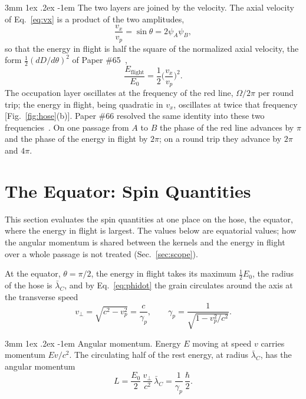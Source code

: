 \documentclass[%
 reprint, amsmath,amssymb, aps, prb, ]{revtex4-2}
\makeatletter
\numberwithin{equation}{section}
\renewcommand\paragraph{%
  \@startsection{paragraph}{4}{\z@}%
    {3mm \@plus 1ex \@minus .2ex}%
    {-1em}%
    {\normalfont\normalsize\itshape}}
\newcommand{\lbar}{\bar{\lambda}_C}
\makeatother
\begin{document}
\paragraph{The two layers are joined by the velocity.} The axial velocity of Eq.~\eqref{eq:vx} is a product of the two amplitudes,
\begin{equation}
\frac{v_x}{v_p} = \sin\theta = 2\psi_A\psi_B ,
\label{eq:vprod}
\end{equation}
so that the energy in flight is half the square of the normalized axial velocity, the form $\tfrac12(dD/d\theta)^2$ of Paper \#65~\cite{H65},
\begin{equation}
\frac{E_{\text{flight}}}{E_0} = \frac12\Big(\frac{v_x}{v_p}\Big)^2 .
\label{eq:flightv}
\end{equation}
The occupation layer oscillates at the frequency of the red line, $\Omega/2\pi$ per round trip; the energy in flight, being quadratic in $v_x$, oscillates at twice that frequency [Fig.~\ref{fig:hose}(b)]. Paper \#66 resolved the same identity into these two frequencies~\cite{H66}. On one passage from $A$ to $B$ the phase of the red line advances by $\pi$ and the phase of the energy in flight by $2\pi$; on a round trip they advance by $2\pi$ and $4\pi$.

\section{The Equator: Spin Quantities}
\label{sec:ring}

This section evaluates the spin quantities at one place on the hose, the equator, where the energy in flight is largest. The values below are equatorial values; how the angular momentum is shared between the kernels and the energy in flight over a whole passage is not treated (Sec.~\ref{sec:scope}).

At the equator, $\theta = \pi/2$, the energy in flight takes its maximum $\tfrac12E_0$, the radius of the hose is $\lbar$, and by Eq.~\eqref{eq:phidot} the grain circulates around the axis at the transverse speed
\begin{equation}
v_\perp = \sqrt{c^2 - v_p^2} = \frac{c}{\gamma_p}, \qquad \gamma_p = \frac{1}{\sqrt{1 - v_p^2/c^2}} .
\label{eq:vperp}
\end{equation}

\paragraph{Angular momentum.} Energy $E$ moving at speed $v$ carries momentum $Ev/c^2$. The circulating half of the rest energy, at radius $\lbar$, has the angular momentum
\begin{equation}
L = \frac{E_0}{2}\,\frac{v_\perp}{c^2}\,\lbar = \frac{1}{\gamma_p}\,\frac{\hbar}{2} .
\label{eq:L}
\end{equation}
\end{document}
